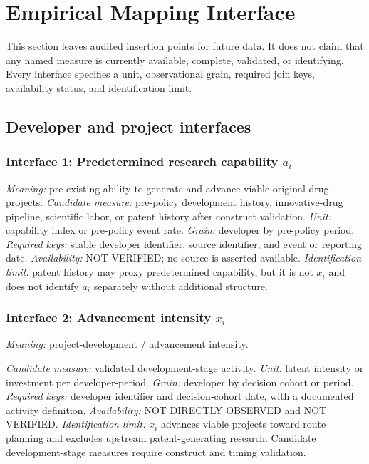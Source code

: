 \section{Empirical Mapping Interface}
\label{sec:p10-mapping}

This section leaves audited insertion points for future data. It does not
claim that any named measure is currently available, complete, validated, or
identifying. Every interface specifies a unit, observational grain, required
join keys, availability status, and identification limit.

\subsection{Developer and project interfaces}
\label{subsec:p10-developer-project}

\subsubsection{Interface 1: Predetermined research capability \texorpdfstring{\(a_i\)}{a(i)}}
\textit{Meaning:} pre-existing ability to generate and advance viable
original-drug projects.
\textit{Candidate measure:} pre-policy development history, innovative-drug
pipeline, scientific labor, or patent history after construct validation.
\textit{Unit:} capability index or pre-policy event rate.
\textit{Grain:} developer by pre-policy period.
\textit{Required keys:} stable developer identifier, source identifier, and
event or reporting date.
\textit{Availability:} NOT VERIFIED; no source is asserted available.
\textit{Identification limit:} patent history may proxy predetermined
capability, but it is not \(x_i\) and does not identify \(a_i\) separately
without additional structure.

\subsubsection{Interface 2: Advancement intensity \texorpdfstring{\(x_i\)}{x(i)}}
\textit{Meaning:} project-development / advancement intensity.

\textit{Candidate measure:} validated development-stage activity.
\textit{Unit:} latent intensity or investment per developer-period.
\textit{Grain:} developer by decision cohort or period.
\textit{Required keys:} developer identifier and decision-cohort date, with a
documented activity definition.
\textit{Availability:} NOT DIRECTLY OBSERVED and NOT VERIFIED.
\textit{Identification limit:} \(x_i\) advances viable projects toward route planning and excludes
upstream patent-generating research. Candidate development-stage measures
require construct and timing validation.

